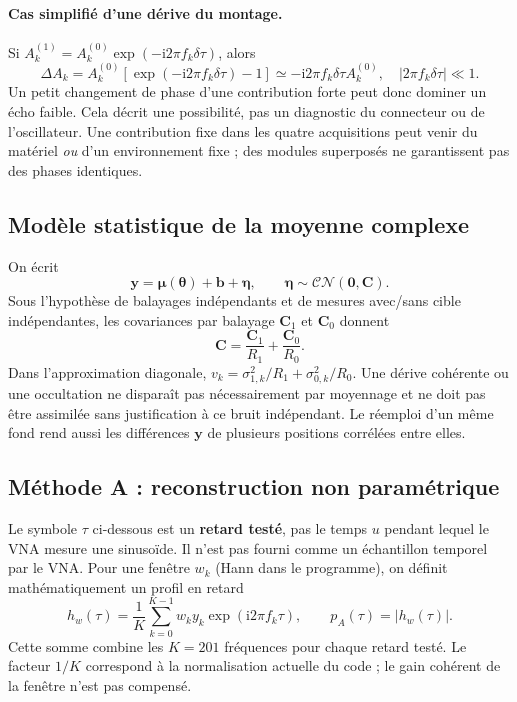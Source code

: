 \documentclass[11pt,a4paper]{article}
\newcommand{\ii}{\mathrm{i}}
\newcommand{\CN}{\mathcal{CN}}
\begin{document}
\paragraph{Cas simplifié d'une dérive du montage.}
Si $A^{(1)}_k=A^{(0)}_k\exp(-\ii2\pi f_k\delta\tau)$, alors
\begin{equation}
 \Delta A_k=A^{(0)}_k[\exp(-\ii2\pi f_k\delta\tau)-1]
 \simeq-\ii2\pi f_k\delta\tau A^{(0)}_k,
 \quad |2\pi f_k\delta\tau|\ll1.
\end{equation}
Un petit changement de phase d'une contribution forte peut donc dominer
un écho faible. Cela décrit une possibilité, pas un diagnostic du connecteur
ou de l'oscillateur. Une contribution fixe dans les quatre acquisitions peut
venir du matériel \emph{ou} d'un environnement fixe ; des modules superposés
ne garantissent pas des phases identiques.

\subsection{Modèle statistique de la moyenne complexe}

On écrit
\begin{equation}\label{eq:cible-stat}
 \mathbf y=\boldsymbol\mu(\boldsymbol\theta)+\mathbf b+
 \boldsymbol\eta,\qquad
 \boldsymbol\eta\sim\CN(\mathbf0,\mathbf C).
\end{equation}
Sous l'hypothèse de balayages indépendants et de mesures avec/sans cible
indépendantes, les covariances par balayage $\mathbf C_1$ et $\mathbf C_0$
donnent
\begin{equation}
 \mathbf C=\frac{\mathbf C_1}{R_1}+\frac{\mathbf C_0}{R_0}.
\end{equation}
Dans l'approximation diagonale, $v_k=\sigma_{1,k}^2/R_1+
\sigma_{0,k}^2/R_0$. Une dérive cohérente ou une occultation ne disparaît
pas nécessairement par moyennage et ne doit pas être assimilée sans justification
à ce bruit indépendant. Le réemploi d'un même fond rend aussi les différences
$\mathbf y$ de plusieurs positions corrélées entre elles.

\subsection{Méthode A : reconstruction non paramétrique}

Le symbole $\tau$ ci-dessous est un \textbf{retard testé}, pas le temps $u$
pendant lequel le VNA mesure une sinusoïde. Il n'est pas fourni comme un
échantillon temporel par le VNA. Pour une fenêtre $w_k$ (Hann dans le programme),
on définit mathématiquement un profil en retard
\begin{equation}\label{eq:cible-A}
 h_w(\tau)=\frac1K\sum_{k=0}^{K-1}w_k y_k\exp(\ii2\pi f_k\tau),
 \qquad p_A(\tau)=|h_w(\tau)|.
\end{equation}
Cette somme combine les $K=201$ fréquences pour chaque retard testé. Le
facteur $1/K$ correspond à la normalisation actuelle du code ; le gain
cohérent de la fenêtre n'est pas compensé.
\end{document}
